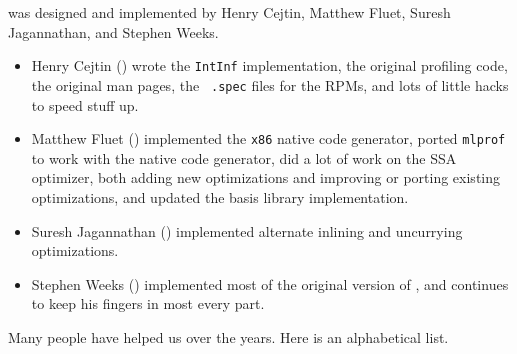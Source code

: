 
{\mlton} was designed and implemented by Henry Cejtin, Matthew Fluet, Suresh
Jagannathan, and Stephen Weeks.

\begin{itemize}

\item
Henry Cejtin () wrote the {\tt IntInf}
implementation, the original profiling code, the original man pages, the {\tt
.spec} files for the RPMs, and lots of little hacks to speed stuff up.

\item
Matthew Fluet () implemented the {\tt x86} native
code generator, ported {\tt mlprof} to work with the native code generator, 
did a lot of work on the SSA optimizer, both adding new optimizations and
improving or porting existing optimizations, and updated the basis library 
implementation.

\item
Suresh Jagannathan () implemented
alternate inlining and uncurrying optimizations.

\item
Stephen Weeks () implemented most of the original
version of {\mlton}, and continues to keep his fingers in most every part.

\end{itemize}

Many people have helped us over the years.  Here is an alphabetical list.

